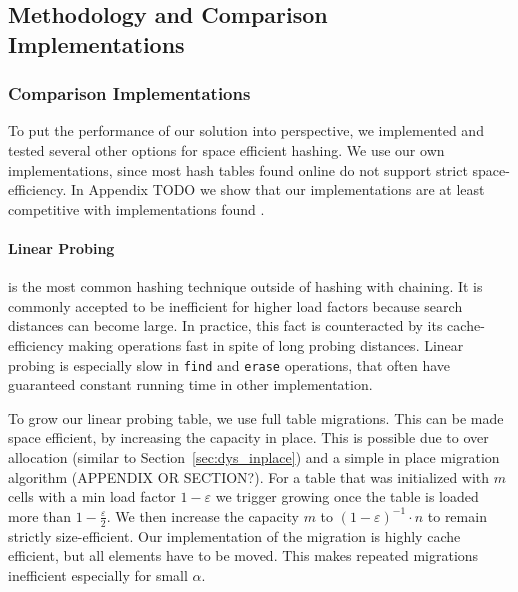 \documentclass[a4paper,UKenglish]{lipics-v2016}
\begin{document}
\subsection{Methodology and Comparison Implementations}

\subsubsection*{Comparison Implementations}
\label{sec:exp_competitor}
To put the performance of our solution into perspective, we
implemented and tested several other options for space efficient
hashing.  We use our own implementations, since most hash tables found
online do not support strict space-efficiency.  In Appendix TODO we
show that our implementations are at least competitive with
implementations found .

\paragraph*{Linear Probing} is the most common hashing technique outside of
hashing with chaining.  It is commonly accepted to be inefficient for
higher load factors because search distances can become large.  In
practice, this fact is counteracted by its cache-efficiency making
operations fast in spite of long probing distances.  Linear probing is
especially slow in \verb~find~ and \verb~erase~ operations, that often have
guaranteed constant running time in other implementation.

To grow our linear probing table, we use full table migrations.  This
can be made space efficient, by increasing the capacity in place.
This is possible due to over allocation (similar to
Section~\ref{sec:dys_inplace}) and a simple in place migration
algorithm (APPENDIX OR SECTION?).  For a table that was
initialized with $m$ cells with a min load factor $1-\varepsilon$ we
trigger growing once the table is loaded more than
$1-\frac{\varepsilon}{2}$. We then increase the capacity $m$ to
$(1-\varepsilon)^{-1}\cdot n$ to remain strictly size-efficient.  Our implementation
of the migration is highly cache efficient, but all elements have to
be moved.  This makes repeated migrations inefficient especially for
small $\alpha$.
\end{document}
